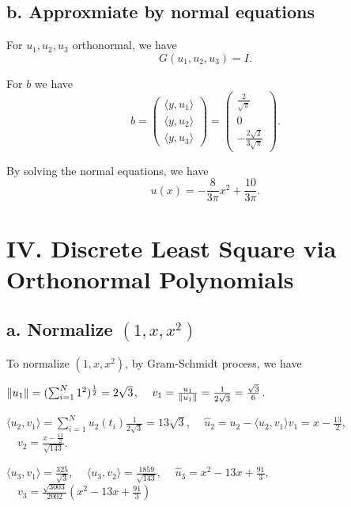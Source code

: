 \documentclass[a4paper]{article}
\begin{document}
\subsection*{b. Approxmiate by normal equations}

For $u_1, u_2, u_3$ orthonormal, we have
\begin{equation}
    G(u_1, u_2, u_3) = I. 
\end{equation}

For $b$ we have
\begin{equation}
    b = \begin{pmatrix} \langle y, u_1 \rangle \\ \langle y, u_2 \rangle \\ \langle y, u_3 \rangle \end{pmatrix} = \begin{pmatrix} \frac{2}{\sqrt{\pi}} \\ 0 \\ -\frac{2 \sqrt{2}}{3 \sqrt{\pi}} \end{pmatrix}.
\end{equation}

By solving the normal equations, we have
\begin{equation}
    u(x) = -\frac{8}{3 \pi} x^2 + \frac{10}{3 \pi}. 
\end{equation}


\section*{IV. Discrete Least Square via Orthonormal Polynomials}

\subsection*{a. Normalize $(1, x, x^2)$ }

To normalize $(1, x, x^2)$, by Gram-Schmidt process, we have

$\norm{u_1} = (\sum_{i=1}^{N} 1^2) ^{\frac{1}{2}} = 2 \sqrt{3}$, $\quad v_1 = \frac{u_1}{\norm{u_1}} = \frac{1}{2 \sqrt{3}} = \frac{\sqrt{3}}{6}$.

$\langle u_2, v_1 \rangle = \sum_{i=1}^{N} u_2(t_i) \frac{1}{2 \sqrt{3}} = 13 \sqrt{3}$, $\quad \hat{u}_2 = u_2 - \langle u_2, v_1 \rangle v_1 = x - \frac{13}{2}$, $\quad v_2 = \frac{x - \frac{13}{2}}{\sqrt{143}}$. 

$\langle u_3, v_1 \rangle = \frac{325}{\sqrt{3}}$, $\quad \langle u_3, v_2 \rangle = \frac{1859}{\sqrt{143}}$, $\quad \hat{u}_3 = x^2 - 13 x + \frac{91}{3}$, $\quad v_3 = \frac{\sqrt{3003}}{2002}(x^2 - 13 x + \frac{91}{3}) $
\end{document}
